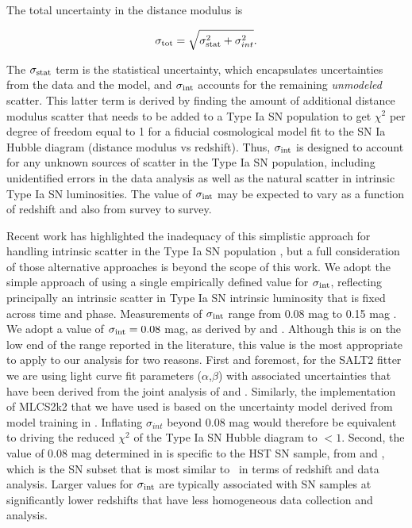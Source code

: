The total uncertainty in the distance modulus is  

\begin{equation} \label{eqn:sigmatot}
 \sigma_{\rm tot} = \sqrt{ \sigma_{\rm stat}^2 + \sigma_{int}^2}.
\end{equation}

\noindent
The $\sigma_{\rm stat}$ term is the statistical uncertainty, which
encapsulates uncertainties from the data and the model, and
$\sigma_{\rm int}$ accounts for the remaining {\it unmodeled} scatter.
This latter term is derived by finding the amount of additional
distance modulus scatter that needs to be added to a Type Ia SN
population to get $\chi^2$ per degree of freedom equal to 1 for a
fiducial cosmological model fit to the SN Ia Hubble diagram (distance
modulus vs redshift).  Thus, $\sigma_{\rm int}$ is designed to account
for any unknown sources of scatter in the Type Ia SN population,
including unidentified errors in the data analysis as well as the
natural scatter in intrinsic Type Ia SN luminosities.  The value of
$\sigma_{\rm int}$ may be expected to vary as a function of redshift
and also from survey to survey.

Recent work has highlighted the inadequacy of this simplistic approach
for handling intrinsic scatter in the Type Ia SN
population \citep{Marriner:2011,Kessler:2013,Mosher:2014,Scolnic:2014a,Betoule:2014},
but a full consideration of those alternative approaches is beyond the
scope of this work.  We adopt the simple approach of using a single
empirically defined value for $\sigma_{\rm int}$, reflecting
principally an intrinsic scatter in Type Ia SN intrinsic luminosity
that is fixed across time and phase.  Measurements of $\sigma_{\rm
int}$ range from 0.08 mag \citep{Jha:2007,Conley:2011} to 0.15
mag \citep{Kessler:2009b,Suzuki:2012}.  We adopt a value of
$\sigma_{\rm int}=0.08$ mag, as derived by \citet{Jha:2007}
and \citet{Conley:2011}.  Although this is on the low end of the range
reported in the literature, this value is the most appropriate to
apply to our analysis for two reasons.  First and foremost, for the
SALT2 fitter we are using light curve fit parameters
($\alpha$,$\beta$) with associated uncertainties that have been
derived from the joint analysis of \citet{Conley:2011}
and \citet{Sullivan:2011}. Similarly, the implementation of MLCS2k2
that we have used is based on the uncertainty model derived from model
training in \citet{Jha:2007}.  Inflating $\sigma_{int}$ beyond 0.08
mag would therefore be equivalent to driving the reduced $\chi^2$ of
the Type Ia SN Hubble diagram to $<1$.  Second, the value of 0.08 mag
determined in \citet{Conley:2011} is specific to the HST SN sample,
from \citet{Riess:2007} and \citet{Suzuki:2012}, which is the SN
subset that is most similar to \tomas\ in terms of redshift and data
analysis.  Larger values for $\sigma_{\rm int}$ are typically
associated with SN samples at significantly lower redshifts that have
less homogeneous data collection and analysis. 

